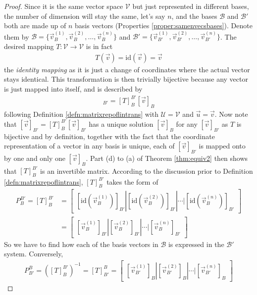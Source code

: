 \begin{proof}
Since it is the same vector space $\mathcal{V}$ but just represented in different bases, the number of dimension will stay the same, let's say $n$, and the bases $\mathcal{B}$ and $\mathcal{B}'$ both are made up of $n$ basis vectors (Properties \ref{proper:samenvecsbases}). Denote them by $\mathcal{B} = \{\vec{v}_{B}^{(1)}, \vec{v}_{B}^{(2)}, \ldots, \vec{v}_{B}^{(n)}\}$ and $\mathcal{B'} = \{\vec{v}_{B'}^{(1)}, \vec{v}_{B'}^{(2)}, \ldots, \vec{v}_{B'}^{(n)}\}$. The desired mapping $T: \mathcal{V} \to \mathcal{V}$ is in fact
\begin{align}
T(\vec{v}) = \text{id}(\vec{v}) = \vec{v}
\end{align}
the \textit{identity mapping} as it is just a change of coordinates where the actual vector stays identical. This transformation is then trivially bijective because any vector is just mapped into itself, and is described by 
\begin{align}
[\vec{v}]_{B'} = [T]_B^{B'} [\vec{v}]_B \label{eqn:bijectvTv}
\end{align}
following Definition \ref{defn:matrixrepoflintrans} with $\mathcal{U} = \mathcal{V}$ and $\vec{u} = \vec{v}$. Now note that $[\vec{v}]_{B'} = [T]_B^{B'} [\vec{v}]_{B'}$ has a unique solution $[\vec{v}]_B$ for any $[\vec{v}]_{B'}$ as $T$ is bijective and by definition, together with the fact that the coordinate representation of a vector in any basis is unique, each of $[\vec{v}]_{B'}$ is mapped onto by one and only one $[\vec{v}]_B$. Part (d) to (a) of Theorem \ref{thm:equiv2} then shows that $[T]_B^{B'}$ is an invertible matrix. According to the discussion prior to Definition \ref{defn:matrixrepoflintrans}, $[T]_B^{B'}$ takes the form of
\begin{align}
P_B^{B'} = [T]_B^{B'} &= \begin{bmatrix}
[\text{id}(\vec{v}_{B}^{(1)})]_{B'} | [\text{id}(\vec{v}_{B}^{(2)})]_{B'} | \cdots | [\text{id}(\vec{v}_{B}^{(n)})]_{B'}
\end{bmatrix} \nonumber \\
&= \label{eqn:PBB'}
\begin{bmatrix}
[\vec{v}_{B}^{(1)}]_{B'} | [\vec{v}_{B}^{(2)}]_{B'} | \cdots | [\vec{v}_{B}^{(n)}]_{B'}
\end{bmatrix}
\end{align}
So we have to find how each of the basis vectors in $\mathcal{B}$ is expressed in the $\mathcal{B}'$ system. Conversely,
\begin{align}
P_{B'}^B = ([T]_B^{B'})^{-1} = [T]_{B'}^B =
\begin{bmatrix}
[\vec{v}_{B'}^{(1)}]_B | [\vec{v}_{B'}^{(2)}]_B | \cdots | [\vec{v}_{B'}^{(n)}]_B
\end{bmatrix}
\end{align}
\end{proof}
